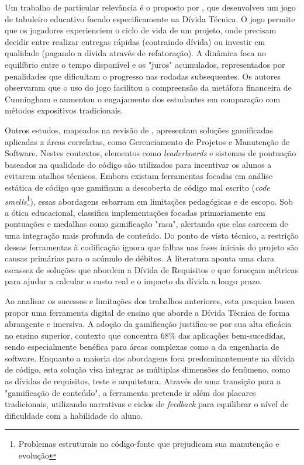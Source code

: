 \documentclass[12pt,openright,oneside,a4paper,brazil]{abntex2}
\begin{document}
Um trabalho de particular relevância é o proposto por \cite{KREBS}, que desenvolveu um jogo de tabuleiro educativo focado especificamente na Dívida Técnica. O jogo permite que os jogadores experienciem o ciclo de vida de um projeto, onde precisam decidir entre realizar entregas rápidas (contraindo dívida) ou investir em qualidade (pagando a dívida através de refatoração). A dinâmica foca no equilíbrio entre o tempo disponível e os "juros" acumulados, representados por penalidades que dificultam o progresso nas rodadas subsequentes. Os autores observaram que o uso do jogo facilitou a compreensão da metáfora financeira de Cunningham e aumentou o engajamento dos estudantes em comparação com métodos expositivos tradicionais.

Outros estudos, mapeados na revisão de \cite{TONHAO2023}, apresentam soluções gamificadas aplicadas a áreas correlatas, como Gerenciamento de Projetos e Manutenção de Software. Nestes contextos, elementos como \textit{leaderboards} e sistemas de pontuação baseados na qualidade do código são utilizados para incentivar os alunos a evitarem atalhos técnicos. Embora existam ferramentas focadas em análise estática de código que gamificam a descoberta de código mal escrito (\textit{code smells}\footnote{Problemas estruturais no código-fonte que prejudicam sua manutenção e evolução}), essas abordagens esbarram em limitações pedagógicas e de escopo. Sob a ótica educacional, \cite{Khaldi2023} classifica implementações focadas primariamente em pontuações e medalhas como gamificação "rasa", alertando que elas carecem de uma integração mais profunda de conteúdo. Do ponto de vista técnico, a restrição dessas ferramentas à codificação ignora que falhas nas fases iniciais do projeto são causas primárias para o acúmulo de débitos. A literatura aponta uma clara escassez de soluções que abordem a Dívida de Requisitos e que forneçam métricas para ajudar a calcular o custo real e o impacto da dívida a longo prazo. \cite{Ruiz2024,MELO2022111483}

Ao analisar os sucessos e limitações dos trabalhos anteriores, esta pesquisa busca propor uma ferramenta digital de ensino que aborde a Dívida Técnica de forma abrangente e imersiva. A adoção da gamificação justifica-se por sua alta eficácia no ensino superior, contexto que concentra 68\% das aplicações bem-sucedidas, sendo especialmente benéfica para áreas complexas como a da engenharia de software. Enquanto a maioria das abordagens foca predominantemente na dívida de código, esta solução visa integrar as múltiplas dimensões do fenômeno, como as dívidas de requisitos, teste e arquitetura. Através de uma transição para a "gamificação de conteúdo", a ferramenta pretende ir além dos placares tradicionais, utilizando narrativas e ciclos de \textit{feedback} para equilibrar o nível de dificuldade com a habilidade do aluno. \cite{doi:10.1177/15554120231158625,Khaldi2023}


\newpage

\end{document}
